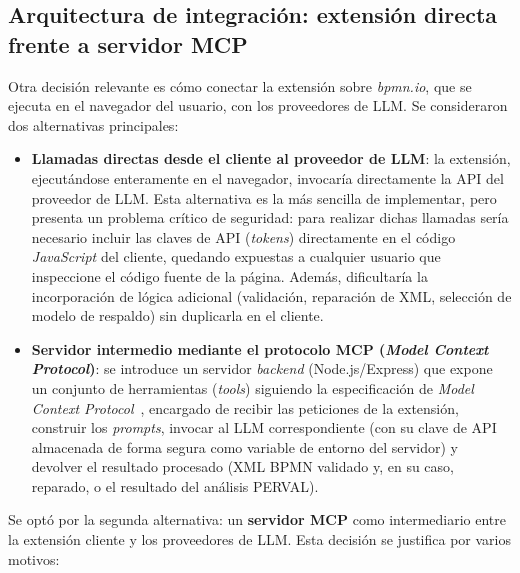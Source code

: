 {%
\subsection{Arquitectura de integración: extensión directa frente a servidor MCP}
\label{subsec:arquitecturaIntegracion}

Otra decisión relevante es cómo conectar la extensión sobre \textit{bpmn.io}, que se ejecuta en el navegador del usuario, con los proveedores de LLM. Se consideraron dos alternativas principales:

\begin{itemize}
    \item \textbf{Llamadas directas desde el cliente al proveedor de LLM}: la extensión, ejecutándose enteramente en el navegador, invocaría directamente la API del proveedor de LLM. Esta alternativa es la más sencilla de implementar, pero presenta un problema crítico de seguridad: para realizar dichas llamadas sería necesario incluir las claves de API (\textit{tokens}) directamente en el código \textit{JavaScript} del cliente, quedando expuestas a cualquier usuario que inspeccione el código fuente de la página. Además, dificultaría la incorporación de lógica adicional (validación, reparación de XML, selección de modelo de respaldo) sin duplicarla en el cliente.
    \item \textbf{Servidor intermedio mediante el protocolo MCP (\textit{Model Context Protocol})}: se introduce un servidor \textit{backend} (Node.js/Express) que expone un conjunto de herramientas (\textit{tools}) siguiendo la especificación de \textit{Model Context Protocol}~\cite{anthropic2024mcp}, encargado de recibir las peticiones de la extensión, construir los \textit{prompts}, invocar al LLM correspondiente (con su clave de API almacenada de forma segura como variable de entorno del servidor) y devolver el resultado procesado (XML BPMN validado y, en su caso, reparado, o el resultado del análisis PERVAL).
\end{itemize}

Se optó por la segunda alternativa: un \textbf{servidor MCP} como intermediario entre la extensión cliente y los proveedores de LLM. Esta decisión se justifica por varios motivos:

}
